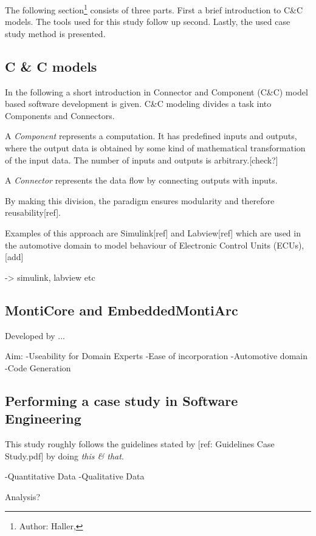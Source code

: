 The following section\footnote{Author: Haller, } consists of three parts. First a brief introduction to C\&C models. The tools used for this study follow up second. Lastly, the used case study method is presented.


\subsection{C \& C models}

In the following a short introduction in Connector and Component (C\&C) model based software development is given. C\&C modeling divides a task into Components and Connectors. 

A \emph{Component} represents a computation. It has predefined inputs and outputs, where the output data is obtained by some kind of mathematical transformation of the input data. The number of inputs and outputs is arbitrary.[check?]

A \emph{Connector} represents the data flow by connecting outputs with inputs.  

By making this division, the paradigm ensures modularity and therefore reusability[ref].

Examples of this approach are Simulink[ref] and Labview[ref] which are used in the automotive domain to model behaviour of Electronic Control Units (ECUs), [add]

-> simulink, labview etc

\subsection{MontiCore and EmbeddedMontiArc}

Developed by ...

Aim:
-Useability for Domain Experts
-Ease of incorporation
-Automotive domain
-Code Generation



\subsection{Performing a case study in Software Engineering}

This study roughly follows the guidelines stated by [ref: Guidelines Case Study.pdf] by doing \emph{this \& that}.

-Quantitative Data
-Qualitative Data

Analysis?
